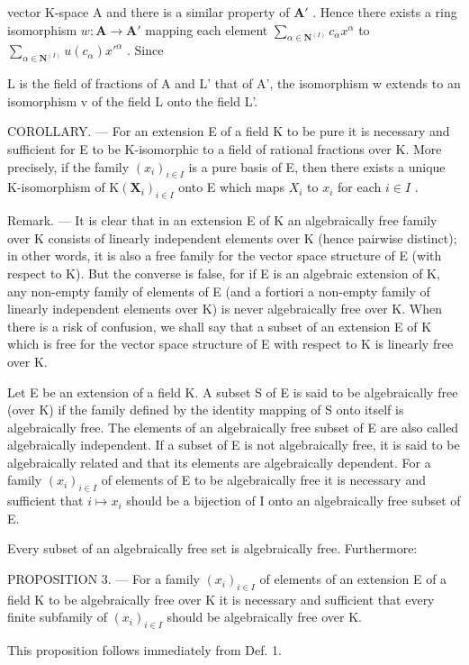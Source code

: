 vector K-space A and there is a similar property of \(\mathbf{A}'\) . Hence there exists a ring isomorphism \(w: \mathbf{A} \to \mathbf{A}'\) mapping each element \(\sum_{\alpha \in \mathbf{N}^{(I)}} c_{\alpha} x^{\alpha}\) to \(\sum_{\alpha \in \mathbf{N}^{(I)}} u(c_{\alpha}) x'^{\alpha}\) . Since

L is the field of fractions of A and L' that of A', the isomorphism w extends to an isomorphism v of the field L onto the field L'.

COROLLARY. --- For an extension E of a field K to be pure it is necessary and sufficient for E to be K-isomorphic to a field of rational fractions over K. More precisely, if the family \((x_{i})_{i\in I}\) is a pure basis of E, then there exists a unique K-isomorphism of \(\mathrm{K}(\mathbf{X}_{i})_{i\in I}\) onto E which maps \(X_{i}\) to \(x_{i}\) for each \(i\in I\) .

Remark. --- It is clear that in an extension E of K an algebraically free family over K consists of linearly independent elements over K (hence pairwise distinct); in other words, it is also a free family for the vector space structure of E (with respect to K). But the converse is false, for if E is an algebraic extension of K, any non-empty family of elements of E (and a fortiori a non-empty family of linearly independent elements over K) is never algebraically free over K. When there is a risk of confusion, we shall say that a subset of an extension E of K which is free for the vector space structure of E with respect to K is linearly free over K.

Let E be an extension of a field K. A subset S of E is said to be algebraically free (over K) if the family defined by the identity mapping of S onto itself is algebraically free. The elements of an algebraically free subset of E are also called algebraically independent. If a subset of E is not algebraically free, it is said to be algebraically related and that its elements are algebraically dependent. For a family \((x_{i})_{i\in I}\) of elements of E to be algebraically free it is necessary and sufficient that \(i\mapsto x_{i}\) should be a bijection of I onto an algebraically free subset of E.

Every subset of an algebraically free set is algebraically free. Furthermore:

PROPOSITION 3. --- For a family \((x_{i})_{i\in I}\) of elements of an extension E of a field K to be algebraically free over K it is necessary and sufficient that every finite subfamily of \((x_{i})_{i\in I}\) should be algebraically free over K.

This proposition follows immediately from Def. 1.

